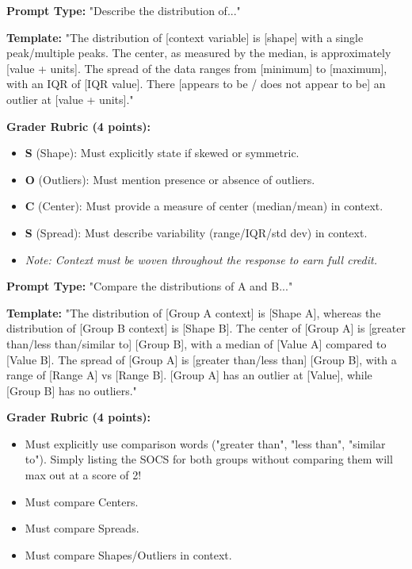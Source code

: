 \begin{frqrubricbox}
\textbf{Prompt Type:} "Describe the distribution of..."

\textbf{Template:}
"The distribution of [context variable] is [shape] with a single peak/multiple peaks. The center, as measured by the median, is approximately [value + units]. The spread of the data ranges from [minimum] to [maximum], with an IQR of [IQR value]. There [appears to be / does not appear to be] an outlier at [value + units]."

\textbf{Grader Rubric (4 points):}
\begin{itemize}
    \item \textbf{S} (Shape): Must explicitly state if skewed or symmetric.
    \item \textbf{O} (Outliers): Must mention presence or absence of outliers.
    \item \textbf{C} (Center): Must provide a measure of center (median/mean) in context.
    \item \textbf{S} (Spread): Must describe variability (range/IQR/std dev) in context.
    \item \textit{Note: Context must be woven throughout the response to earn full credit.}
\end{itemize}
\end{frqrubricbox}

\begin{frqrubricbox}
\textbf{Prompt Type:} "Compare the distributions of A and B..."

\textbf{Template:}
"The distribution of [Group A context] is [Shape A], whereas the distribution of [Group B context] is [Shape B]. The center of [Group A] is [greater than/less than/similar to] [Group B], with a median of [Value A] compared to [Value B]. The spread of [Group A] is [greater than/less than] [Group B], with a range of [Range A] vs [Range B]. [Group A] has an outlier at [Value], while [Group B] has no outliers."

\textbf{Grader Rubric (4 points):}
\begin{itemize}
    \item Must explicitly use comparison words ("greater than", "less than", "similar to"). Simply listing the SOCS for both groups without comparing them will max out at a score of 2!
    \item Must compare Centers.
    \item Must compare Spreads.
    \item Must compare Shapes/Outliers in context.
\end{itemize}
\end{frqrubricbox}

